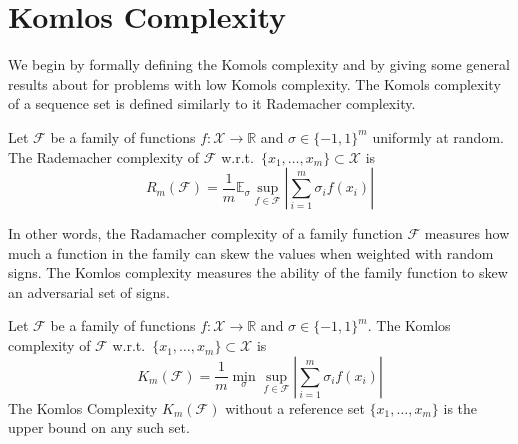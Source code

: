 \documentclass[anon,12pt]{colt2019} %
\newcommand{\R}{\mathbb{R}}
\newcommand{\E}{\mathbb{E}}
\newcommand{\eps}{\epsilon}
\newcommand{\F}{\mathcal{F}}
\newcommand{\X}{\mathcal{X}}
\begin{document}
\begin{itemize}
\end{itemize}

\section{Komlos Complexity}
We begin by formally defining the Komols complexity and by giving some general results about for problems with low Komols complexity. The Komols complexity of a sequence set is defined similarly to it Rademacher complexity.

\begin{definition}
Let $\F$ be a family of functions $f:\X\rightarrow\R$ and $\sigma \in \{-1,1\}^m$ uniformly at random. 
The Rademacher complexity of $\F$ w.r.t.\ $\{x_1,\ldots,x_m\} \subset \X$ is 
\[
R_m(\F) =  \frac{1}{m}\E_{\sigma} \sup_{f \in \F}  \left| \sum_{i=1}^{m}\sigma_i f(x_i) \right|
\]
\end{definition}
%
In other words, the Radamacher complexity of a family function $\F$ measures how much a function in the family can skew the values when weighted with random signs. The Komlos complexity measures the ability of the family function to skew an adversarial set of signs.

\begin{definition}
Let $\F$ be a family of functions $f:\X\rightarrow\R$ and $\sigma \in \{-1,1\}^m$. 
The Komlos complexity of $\F$ w.r.t.\ $\{x_1,\ldots,x_m\} \subset \X$ is 
\[
K_m(\F) =  \frac{1}{m}\min_{\sigma} \sup_{f \in \F}  \left|\sum_{i=1}^{m}\sigma_i f(x_i)\right|
\]
The Komlos Complexity $K_m(\F)$ without a reference set $\{x_1,\ldots,x_m\}$ is the upper bound on any such set.
\end{definition}
\end{document}
